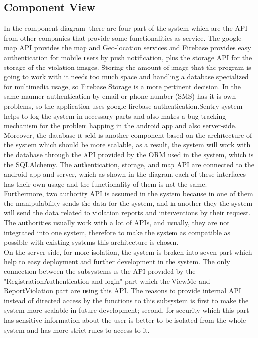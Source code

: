 \subsection{Component View}
In the component diagram, there are four-part of the system which are the API from other companies that provide some functionalities as service. The google map API provides the map and Geo-location services and Firebase provides easy authentication for mobile users by push notification, plus the storage API for the storage of the violation images. Storing the amount of image that the program is going to work with it needs too much space and handling a database specialized for multimedia usage, so Firebase Storage is a more pertinent decision. In the same manner authentication by email or phone number (SMS) has it is own problems, so the application uses google firebase authentication.Sentry system helps to log the system in necessary parts and also makes a bug tracking mechanism for the problem happing in the android app and also server-side. Moreover, the database it seld is another component based on the architecture of the system which should be more scalable, as a result, the system will work with the database through the API provided by the ORM used in the system, which is the SQLAlchemy. The authentication, storage, and map API are connected to the android app and server, which as shown in the diagram each of these interfaces has their own usage and the functionality of them is not the same. \\
Furthermore, two authority API is assumed in the system because in one of them the manipulability sends the data for the system, and in another they the system will send the data related to violation reports and interventions by their request. The authorities usually work with a lot of APIs, and usually, they are not integrated into one system, therefore to make the system as compatible as possible with existing systems this architecture is chosen.\\
 On the server-side, for more isolation, the system is broken into seven-part which help to easy deployment and further development in the system. The only connection between the subsystems is the API provided by the "Registration\/Authentication and login" part which the ViewMe and ReportViolation part are using this API. The reasons to provide internal API instead of directed access by the functions to this subsystem is first to make the system more scalable in future development; second, for security which this part has sensitive information about the user is better to be isolated from the whole system and has more strict rules to access to it.\\
